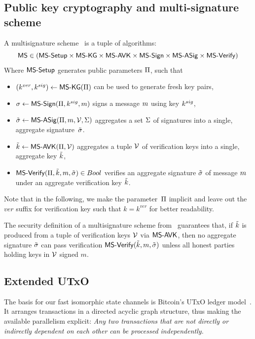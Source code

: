 \subsection{Public key cryptography and multi-signature scheme}\label{sec:multisig}

A multisignature scheme~\cite{itakura1983public,CCS:MicOhtRey01} is a
tuple of algorithms:
\[
\mathsf{MS} \in (\mathsf{MS\textsf{-}{}Setup} \times \allowbreak\mathsf{MS\textsf{-}{}KG} \times \allowbreak\mathsf{MS\textsf{-}{}AVK} \times \allowbreak
\mathsf{MS\textsf{-}{}Sign} \times \allowbreak\mathsf{MS\textsf{-}{}ASig} \times \allowbreak\mathsf{MS\textsf{-}{}Verify})
\]
Where $\mathsf{MS\textsf{-}{}Setup}$ generates public parameters $\Pi$, such that
\begin{itemize}
  \item $(k^{ver},k^{sig}) \gets \mathsf{MS\textsf{-}{}KG}(\Pi)$ can be used to generate fresh
        key pairs,
  \item $\sigma \gets \mathsf{MS\textsf{-}{}Sign}(\Pi,k^{sig},m)$ signs a message $m$
        using key $k^{sig}$,
  \item $\tilde\sigma \gets \mathsf{MS\textsf{-}{}ASig}(\Pi,m,\mathcal{V},\Sigma)$ aggregates
         a set $\Sigma$ of signatures into a single,
        aggregate signature~$\tilde\sigma$.
  \item $\tilde{k} \gets \mathsf{MS\textsf{-}{}AVK}(\Pi,\mathcal{V})$ aggregates a tuple
        $\mathcal{V}$ of verification keys into a single, aggregate key
        $\tilde{k}$,
  \item $\mathsf{MS\textsf{-}{}Verify}(\Pi,\tilde{k},m,\tilde\sigma) \in Bool$ verifies an aggregate
        signature $\tilde\sigma$ of message $m$ under an aggregate verification
        key $\tilde{k}$.
\end{itemize}

Note that in the following, we make the parameter~$\Pi$ implicit and leave
out the $ver$ suffix for verification key such that $k = k^{ver}$ for better
readability.

The security definition of a multisignature scheme
from~\cite{itakura1983public,CCS:MicOhtRey01} guarantees that, if $\tilde{k}$ is
produced from a tuple of verification keys $\mathcal{V}$ via $\mathsf{MS\textsf{-}{}AVK}$,
then no aggregate signature $\tilde\sigma$ can pass verification
$\mathsf{MS\textsf{-}{}Verify}(\tilde{k},m,\tilde\sigma)$ unless all honest parties holding keys in
$\mathcal{V}$ signed $m$.

\subsection{Extended UTxO}
The basis for our fast isomorphic state channels is Bitcoin's UTxO ledger model~\cite{formal-model-of-bitcoin-transactions,Zahnentferner18-UTxO}. It arranges transactions in a directed acyclic graph structure, thus making the available parallelism explicit: \emph{Any two transactions that are not directly or indirectly dependent on each other can be processed independently.}

